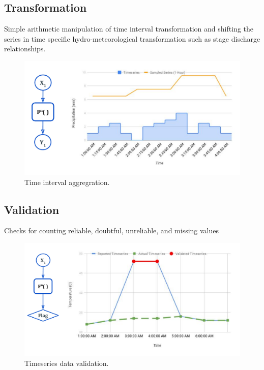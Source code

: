 \subsection{Transformation}
Simple arithmetic manipulation of time interval transformation and shifting the series in time specific hydro-meteorological transformation such as stage discharge relationships.
\begin{figure}[htp]
    \centering
    \includegraphics[width=1.0\textwidth]{method/data_preprocess/transformation.pdf}
    \caption{Time interval aggregration.}
    \label{fi:transformation}
\end{figure}

\subsection{Validation}
Checks for counting reliable, doubtful, unreliable, and missing values
\begin{figure}[htp]
    \centering
    \includegraphics[width=1.0\textwidth]{method/data_preprocess/validation.pdf}
    \caption{Timeseries data validation.}
    \label{fi:validation}
\end{figure}

